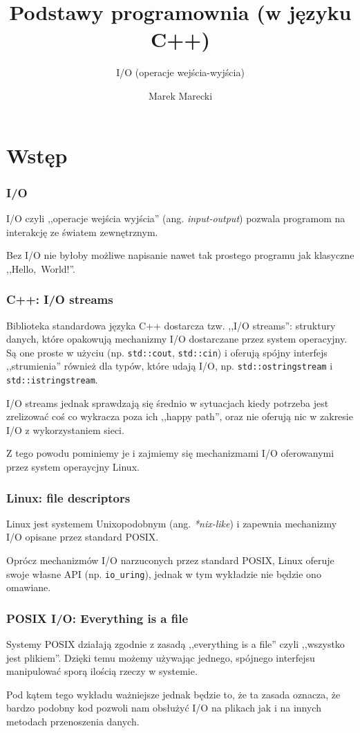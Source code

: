 \documentclass[aspectratio=169]{beamer}
\title{Podstawy programownia (w języku C++)}
\subtitle{I/O (operacje wejścia-wyjścia)}
\author{Marek Marecki}
\institute{Polsko-Japońska Akademia Technik Komputerowych}
\begin{document}
{%
    \frame{\titlepage}
}

\section{Wstęp}

\begin{frame}
    \frametitle{I/O}

    I/O czyli ,,operacje wejścia wyjścia'' (ang. \emph{input-output}) pozwala
    programom na interakcję ze światem zewnętrznym.

    Bez I/O nie byłoby możliwe napisanie nawet tak prostego programu jak
    klasyczne ,,Hello,~World!''.
\end{frame}

\begin{frame}
    \frametitle{C++: I/O streams}

    Biblioteka standardowa języka C++ dostarcza tzw. ,,I/O streams'': struktury
    danych, które opakowują mechanizmy I/O dostarczane przez system operacyjny.
    Są one proste w użyciu (np. \texttt{std::cout}, \texttt{std::cin}) i oferują
    spójny interfejs ,,strumienia'' również dla typów, które udają I/O, np.
    \texttt{std::ostringstream} i \texttt{std::istringstream}.

    \vspace{1em}

    I/O streams jednak sprawdzają się średnio w sytuacjach kiedy potrzeba jest
    zrelizować coś co wykracza poza ich ,,happy path'', oraz nie oferują nic w
    zakresie I/O z wykorzystaniem sieci.

    Z tego powodu pominiemy je i zajmiemy się mechanizmami I/O oferowanymi przez
    system operaycjny Linux.
\end{frame}

\begin{frame}
    \frametitle{Linux: file descriptors}

    Linux jest systemem Unixopodobnym (ang. \emph{*nix-like}) i zapewnia
    mechanizmy I/O opisane przez standard POSIX.

    \vspace{1em}

    Oprócz mechanizmów I/O narzuconych przez standard POSIX, Linux oferuje swoje
    własne API (np. \texttt{io\_uring}), jednak w tym wykładzie nie będzie ono
    omawiane.
\end{frame}

\begin{frame}
    \frametitle{POSIX I/O: Everything is a file}

    Systemy POSIX działają zgodnie z zasadą ,,everything is a file'' czyli
    ,,wszystko jest plikiem''. Dzięki temu możemy używając jednego, spójnego
    interfejsu manipulować sporą ilością rzeczy w systemie.

    \vspace{1em}

    Pod kątem tego wykładu ważniejsze jednak będzie to, że ta zasada oznacza, że
    bardzo podobny kod pozwoli nam obsłużyć I/O na plikach jak i na innych
    metodach przenoszenia danych.
\end{frame}
\end{document}
